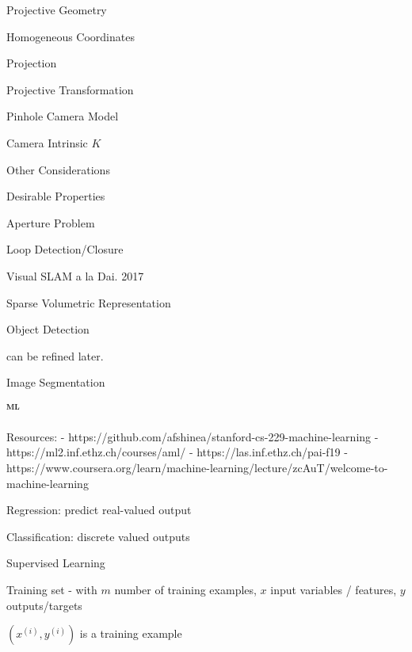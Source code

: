 \begin{section}
\begin{subsubsection}
\begin{subsubsection}
\begin{subsubsection}
\begin{section}{Projective Geometry}
\begin{subsection}{Homogeneous Coordinates}
\begin{subsubsection}
{\begin{subsubsection}{Projection}
\begin{subsubsection}{Projective Transformation}
\begin{subsection}
\begin{subsubsection}
\begin{subsubsection}
\begin{subsubsection}
{\begin{subsubsection}
\begin{subsection}
\begin{subsection} {Pinhole Camera Model}
\begin{subsection} {Camera Intrinsic $K$}
\begin{subsection}
\begin{subsection}
\begin{subsubsection}{Other Considerations}
{\begin{subsection}
\begin{subsubsection}{Desirable Properties}
\begin{section}
\begin{subsection}
\begin{subsection}
\begin{subsection}
\begin{section}
\begin{subsection}
\begin{subsubsection}
\begin{subsubsection}
\begin{subsection}
\begin{section}
\begin{subsection}
\begin{subsubsection}{Aperture Problem}
\begin{subsubsection}
{\begin{section}
\begin{subsubsection}
\begin{subsubsection}
\begin{subsubsection}
\begin{subsection}
\begin{subsection}
\begin{subsection}
\begin{subsection}
\begin{subsection}
\begin{subsection}
\begin{subsection}
\begin{subsubsection}
{\begin{subsubsection}
{\begin{subsubsection}
\begin{section}
\begin{section}
\begin{section}
\begin{subsubsection}
\begin{subsubsection}{Loop Detection/Closure}
\begin{subsubsection}{Visual SLAM a la Dai. 2017}
\begin{subsubsection}{Sparse Volumetric Representation}
\begin{subsection}
\begin{section}{Object Detection}
\begin{subsubsection}
{\begin{subsection}
\begin{subsection}
can be refined later.

\begin{section} Image Segmentation



\chapter{ML}

Resources:
- https://github.com/afshinea/stanford-cs-229-machine-learning
- https://ml2.inf.ethz.ch/courses/aml/
- https://las.inf.ethz.ch/pai-f19
- https://www.coursera.org/learn/machine-learning/lecture/zcAuT/welcome-to-machine-learning

Regression: predict real-valued output

Classification: discrete valued outputs

\begin{section} Supervised Learning

Training set - with $m$ number of training examples, $x$ input variables / features, $y$ outputs/targets

$(x^{(i)},y^{(i)})$ is a training example

\end{section}
\end{section}
\end{subsection}
\end{subsection}}
\end{subsubsection}
\end{section}
\end{subsection}
\end{subsubsection}
\end{subsubsection}
\end{subsubsection}
\end{subsubsection}
\end{section}
\end{section}
\end{section}
\end{subsubsection}}
\end{subsubsection}}
\end{subsubsection}
\end{subsection}
\end{subsection}
\end{subsection}
\end{subsection}
\end{subsection}
\end{subsection}
\end{subsection}
\end{subsubsection}
\end{subsubsection}
\end{subsubsection}
\end{section}}
\end{subsubsection}
\end{subsubsection}
\end{subsection}
\end{section}
\end{subsection}
\end{subsubsection}
\end{subsubsection}
\end{subsection}
\end{section}
\end{subsection}
\end{subsection}
\end{subsection}
\end{section}
\end{subsubsection}
\end{subsection}}
\end{subsubsection}
\end{subsection}
\end{subsection}
\end{subsection}
\end{subsection}
\end{subsection}
\end{subsubsection}}
\end{subsubsection}
\end{subsubsection}
\end{subsubsection}
\end{subsection}
\end{subsubsection}
\end{subsubsection}}
\end{subsubsection}
\end{subsection}
\end{section}
\end{subsubsection}
\end{subsubsection}
\end{subsubsection}
\end{section}
